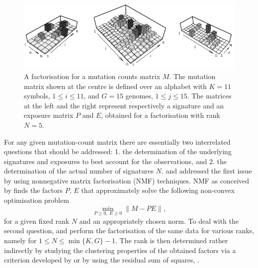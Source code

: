 \documentclass{bioinfo}
\begin{document}
\begin{figure}
  \centering\includegraphics[width = 13.5cm]{figs/f_bw_t}
  \caption{\textrm{%
   A factorisation for a mutation counts matrix $M$. The
   mutation matrix shown at the centre is defined over an alphabet
   with $K = 11$ symbols, $1 \leq i \leq 11$, and $G = 15$ genomes,
   $1\leq j\leq 15$. The matrices at the left and the right
   represent respectively a signature and an exposure matrix $P$ and
   $E$, obtained for a factorisation with rank $N = 5$.
  }
 }
 \label{fig:toyNMF}
\end{figure}

For any given mutation-count matrix there are essentially two
interrelated questions that should be addressed: 1. the determination
of the underlying signatures and exposures to best account for the
observations, and 2. the determination of the actual number of
signatures $N$. \cite{NCell} and \cite{A} addressed the first issue by
using nonnegative matrix factorisation (NMF) techniques. NMF as
conceived by \cite{LS} finds the factors $P$, $E$ that approximately
solve the following non-convex optimisation problem
\begin{equation}
  \label{eqn:NMF}
    \min_{P\geq 0,\ E\geq 0}\|M - PE\|,
\end{equation}
for a given fixed rank $N$ and an appropriately chosen norm.
To deal with the second question, \cite{NCell} and \cite{A}
perform the factorisation of the same data for various ranks, namely
for $1 \leq N \leq \min\{K, G\}-1$. The rank is then determined rather
indirectly by studying the clustering properties of the obtained
factors via a criterion developed by \cite{BTGM} or by using the
residual sum of squares, \cite{HMSG}.
\end{document}
